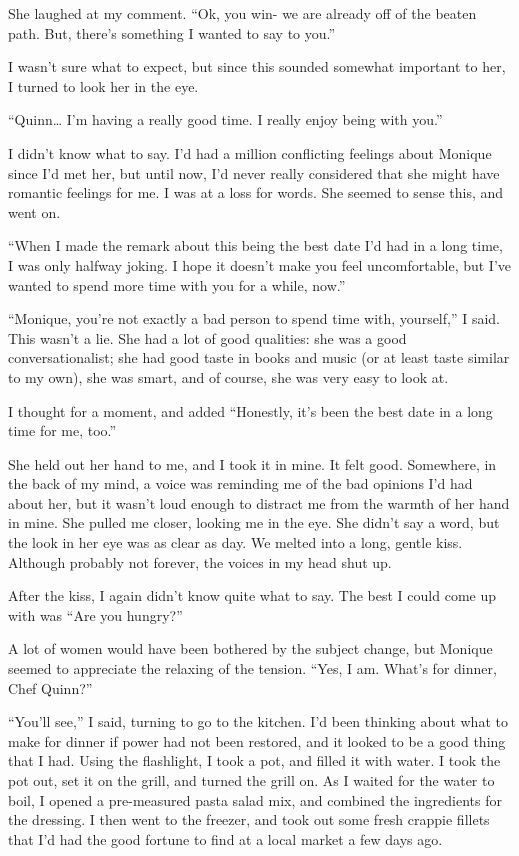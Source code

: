 She laughed at my comment. ``Ok, you win- we are already off of the beaten path. But,
there's something I wanted to say to you.''

I wasn't sure what to expect, but since this sounded somewhat important to her, I turned
to look her in the eye.

``Quinn… I'm having a really good time. I really enjoy being with you.''

I didn't know what to say. I'd had a million conflicting feelings about Monique since I'd
met her, but until now, I'd never really considered that she might have romantic feelings for
me. I was at a loss for words. She seemed to sense this, and went on.

``When I made the remark about this being the best date I'd had in a long time, I was only
halfway joking. I hope it doesn't make you feel uncomfortable, but I've wanted to spend more
time with you for a while, now.''

``Monique, you're not exactly a bad person to spend time with, yourself,'' I said. This
wasn't a lie. She had a lot of good qualities: she was a good conversationalist; she had good
taste in books and music (or at least taste similar to my own), she was smart, and of course,
she was very easy to look at.

I thought for a moment, and added ``Honestly, it's been the best date in a long time for
me, too.''

She held out her hand to me, and I took it in mine. It felt good. Somewhere, in the back
of my mind, a voice was reminding me of the bad opinions I'd had about her, but it wasn't loud
enough to distract me from the warmth of her hand in mine. She pulled me closer, looking me in
the eye. She didn't say a word, but the look in her eye was as clear as day. We melted into a
long, gentle kiss. Although probably not forever, the voices in my head shut up.

After the kiss, I again didn't know quite what to say. The best I could come up with was
``Are you hungry?''

A lot of women would have been bothered by the subject change, but Monique seemed to
appreciate the relaxing of the tension. ``Yes, I am. What's for dinner, Chef Quinn?''

``You'll see,'' I said, turning to go to the kitchen. I'd been thinking about what to make
for dinner if power had not been restored, and it looked to be a good thing that I had. Using
the flashlight, I took a pot, and filled it with water. I took the pot out, set it on the grill,
and turned the grill on. As I waited for the water to boil, I opened a pre-measured pasta salad
mix, and combined the ingredients for the dressing. I then went to the freezer, and took out
some fresh crappie fillets that I'd had the good fortune to find at a local market a few days
ago.

